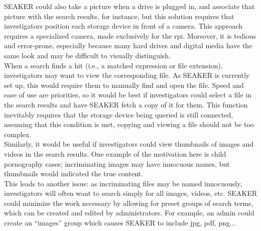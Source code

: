 \documentclass[12pt]{article}
\begin{document}
SEAKER could also take a picture when a drive is plugged in, and associate that picture with the search
results, for instance, but this solution requires that investigators position each storage device in front of
a camera.  This approach requires a specialized camera, made exclusively for the \gls{rpi}.  Moreover,
it is tedious and error-prone, especially because many hard drives and digital media have the same look
and may be difficult to visually distinguish.\\

When a search finds a hit (i.e., a matched expression or file extension), investigators may want to
view the corresponding file. As SEAKER is currently set up, this would require them to manually find and open the file. Speed
and ease of use are priorities, so it would be best if investigators could select a file in the search results
and have SEAKER fetch a copy of it for them. This function inevitably requires that the storage device
being queried is still connected, assuming that this condition is met, copying and viewing a file should
not be too complex.\\

Similarly, it would be useful if investigators could view thumbnails of images and videos in the search
results. One example of the motivation here is child pornography cases; incriminating images may have
innocuous names, but thumbnails would indicated the true content.\\

This leads to another issue: as incriminating files may be named innocuously, investigators will often
want to search simply for all images, videos, etc. SEAKER could minimize the work necessary by
allowing for preset groups of search terms, which can be created and edited by administrators. For
example, an admin could create an ``images'' group which causes SEAKER to include jpg, pdf, png...\\
\end{document}
